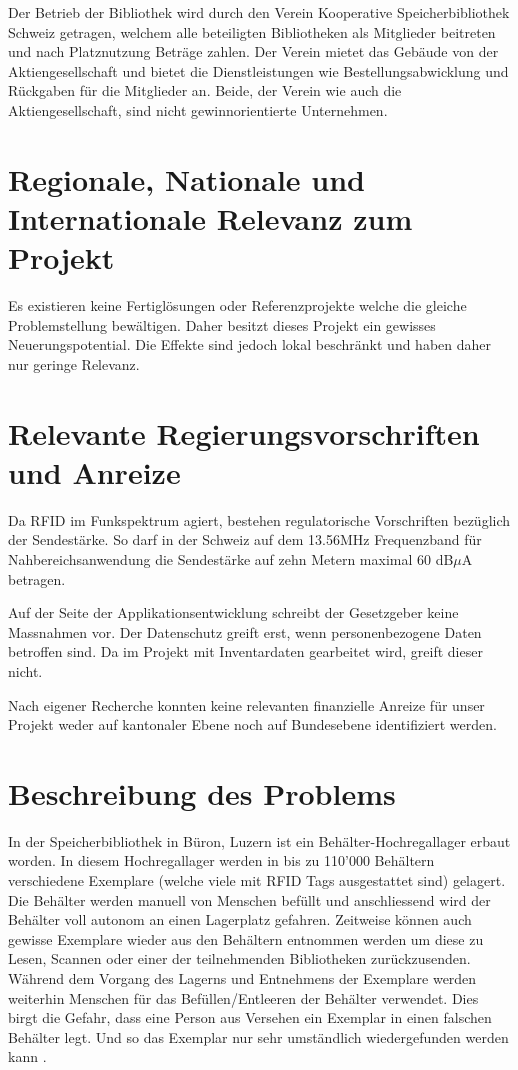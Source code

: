 Der Betrieb der Bibliothek wird durch den Verein Kooperative Speicherbibliothek Schweiz getragen, welchem alle beteiligten Bibliotheken als Mitglieder beitreten und nach Platznutzung Beträge zahlen. Der Verein mietet das Gebäude von der Aktiengesellschaft und bietet die Dienstleistungen wie Bestellungsabwicklung und Rückgaben für die Mitglieder an. Beide, der Verein wie auch die Aktiengesellschaft, sind nicht gewinnorientierte Unternehmen.

\section{Regionale, Nationale und Internationale Relevanz zum Projekt}
Es existieren keine Fertiglösungen oder Referenzprojekte welche die gleiche Problemstellung bewältigen. Daher besitzt dieses Projekt ein gewisses Neuerungspotential. Die Effekte sind jedoch lokal beschränkt und haben daher nur geringe Relevanz.

\section{Relevante Regierungsvorschriften und Anreize}
Da RFID im Funkspektrum agiert, bestehen regulatorische Vorschriften bezüglich der Sendestärke. So darf in der Schweiz auf dem 13.56MHz Frequenzband für Nahbereichsanwendung die Sendestärke auf zehn Metern maximal 60 dB$\mu$A betragen.

Auf der Seite der Applikationsentwicklung schreibt der Gesetzgeber keine Massnahmen vor. Der Datenschutz greift erst, wenn personenbezogene Daten betroffen sind. Da im Projekt mit Inventardaten gearbeitet wird, greift dieser nicht.

Nach eigener Recherche konnten keine relevanten finanzielle Anreize für unser Projekt weder auf kantonaler Ebene noch auf Bundesebene identifiziert werden.

\section{Beschreibung des Problems}
In der Speicherbibliothek in Büron, Luzern ist ein Behälter-Hochregallager erbaut worden. In diesem Hochregallager werden in bis zu 110'000 Behältern verschiedene Exemplare (welche viele mit RFID Tags ausgestattet sind) gelagert. Die Behälter werden manuell von Menschen befüllt und anschliessend wird der Behälter voll autonom an einen Lagerplatz gefahren. Zeitweise können auch gewisse Exemplare wieder aus den Behältern entnommen werden um diese zu Lesen, Scannen oder einer der teilnehmenden Bibliotheken zurückzusenden. Während dem Vorgang des Lagerns und Entnehmens der Exemplare werden weiterhin Menschen für das Befüllen/Entleeren der Behälter verwendet. Dies birgt die Gefahr, dass eine Person aus Versehen ein Exemplar in einen falschen Behälter legt. Und so das Exemplar nur sehr umständlich wiedergefunden werden kann \parencite{HochschuleLuzern2019}.


